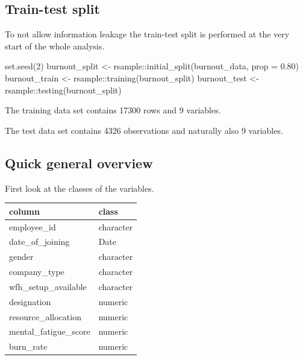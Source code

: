 \documentclass[
]{book}
\newenvironment{Shaded}{\begin{snugshade}}{\end{snugshade}}
\newcommand{\AttributeTok}[1]{\textcolor[rgb]{0.77,0.63,0.00}{#1}}
\newcommand{\DecValTok}[1]{\textcolor[rgb]{0.00,0.00,0.81}{#1}}
\newcommand{\FloatTok}[1]{\textcolor[rgb]{0.00,0.00,0.81}{#1}}
\newcommand{\FunctionTok}[1]{\textcolor[rgb]{0.00,0.00,0.00}{#1}}
\newcommand{\NormalTok}[1]{#1}
\newcommand{\OtherTok}[1]{\textcolor[rgb]{0.56,0.35,0.01}{#1}}
\newcommand{\SpecialCharTok}[1]{\textcolor[rgb]{0.00,0.00,0.00}{#1}}
\begin{document}
\hypertarget{train-test-split}{%
\subsection{Train-test split}\label{train-test-split}}

To not allow information leakage the train-test split is performed at the very start of the whole analysis.

\begin{Shaded}
\begin{Highlighting}[]
\FunctionTok{set.seed}\NormalTok{(}\DecValTok{2}\NormalTok{)}
\NormalTok{burnout\_split }\OtherTok{\textless{}{-}}\NormalTok{ rsample}\SpecialCharTok{::}\FunctionTok{initial\_split}\NormalTok{(burnout\_data, }\AttributeTok{prop =} \FloatTok{0.80}\NormalTok{)}
\NormalTok{burnout\_train }\OtherTok{\textless{}{-}}\NormalTok{ rsample}\SpecialCharTok{::}\FunctionTok{training}\NormalTok{(burnout\_split)}
\NormalTok{burnout\_test  }\OtherTok{\textless{}{-}}\NormalTok{ rsample}\SpecialCharTok{::}\FunctionTok{testing}\NormalTok{(burnout\_split)}
\end{Highlighting}
\end{Shaded}

The training data set contains 17300 rows and 9 variables.

The test data set contains 4326 observations and naturally also 9 variables.

\hypertarget{quick-general-overview}{%
\subsection{Quick general overview}\label{quick-general-overview}}

First look at the classes of the variables.

\begin{tabular}{l|l}
\hline
column & class\\
\hline
employee\_id & character\\
\hline
date\_of\_joining & Date\\
\hline
gender & character\\
\hline
company\_type & character\\
\hline
wfh\_setup\_available & character\\
\hline
designation & numeric\\
\hline
resource\_allocation & numeric\\
\hline
mental\_fatigue\_score & numeric\\
\hline
burn\_rate & numeric\\
\hline
\end{tabular}
\end{document}
